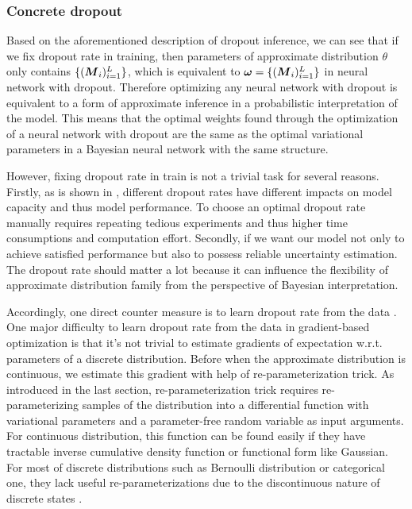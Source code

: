\subsubsection{Concrete dropout}
Based on the aforementioned description of dropout inference, we can see that if we fix dropout rate in training, then parameters of approximate distribution $\theta$ only contains $\{(\boldsymbol M_{i})^L_{i=1}\}$, which is equivalent to $\boldsymbol \omega = \{(\boldsymbol M_{i})^L_{i=1}\}$ in neural network with dropout. Therefore optimizing any neural network with dropout is equivalent to a form of approximate inference in a probabilistic interpretation of the model. This means that the optimal weights found through the optimization of a neural network with dropout are the same as the optimal variational parameters in a Bayesian neural network with the same structure. 

However, fixing dropout rate in train is not a trivial task for several reasons. Firstly, as is shown in \cite{srivastava2014dropout}, different dropout rates have different impacts on model capacity and thus model performance. To choose an optimal dropout rate manually requires repeating tedious experiments and thus higher time consumptions and computation effort. Secondly, if we want our model not only to achieve satisfied performance but also to possess reliable uncertainty estimation. The dropout rate should matter a lot because it can influence the flexibility of approximate distribution family from the perspective of Bayesian interpretation.

Accordingly, one direct counter measure is to learn dropout rate from the data \cite{gal2017concrete}. One major difficulty to learn dropout rate from the data in gradient-based optimization is that it's not trivial to estimate gradients of expectation w.r.t. parameters of a discrete distribution. Before when the approximate distribution is continuous, we estimate this gradient with help of re-parameterization trick. As introduced in the last section, re-parameterization trick requires re-parameterizing samples of the distribution into a differential function with variational parameters and a parameter-free random variable as input arguments. For continuous distribution, this function can be found easily if they have tractable inverse cumulative density function or functional form like Gaussian\cite{kingma2013auto}. For most of discrete distributions such as Bernoulli distribution or categorical one, they lack useful re-parameterizations
due to the discontinuous nature of discrete states \cite{maddison2016concrete}. 

